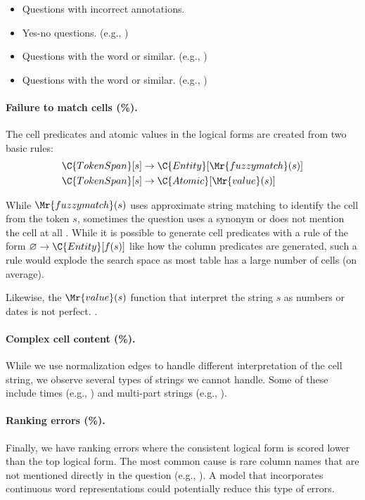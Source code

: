 \begin{itemize}
\item Questions with incorrect annotations.
\item Yes-no questions.
(e.g., )
\item Questions with the word  or similar.
(e.g., )
\item Questions with the word  or similar.
(e.g., )
\end{itemize}

\paragraph{Failure to match cells (\qqq\%).}
The cell predicates and atomic values in the logical forms
are created from two basic rules:
\begin{align*}
\C{TokenSpan}[s] & \to \C{Entity}[\Mr{fuzzymatch}(s)] \\
\C{TokenSpan}[s] & \to \C{Atomic}[\Mr{value}(s)] \\
\end{align*}

While $\Mr{fuzzymatch}(s)$ uses approximate string matching
to identify the cell from the token $s$,
sometimes the question uses a synonym
or does not mention the cell at all
.
While it is possible to generate cell predicates
with a rule of the form $\varnothing \to \C{Entity}[f(s)]$
like how the column predicates are generated,
such a rule would explode the search space
as most table has a large number of cells
(\qqq on average).

Likewise, the $\Mr{value}(s)$ function that interpret
the string $s$ as numbers or dates is not perfect.
.

\paragraph{Complex cell content (\qqq \%).}
While we use normalization edges to handle different
interpretation of the cell string,
we observe several types of strings we cannot handle.
Some of these include times (e.g., )
and multi-part strings (e.g., ).

\paragraph{Ranking errors (\qqq \%).}
Finally, we have ranking errors
where the consistent logical form is scored lower
than the top logical form.
The most common cause is rare column names
that are not mentioned directly in the question
(e.g., ).
A model that incorporates continuous word representations
could potentially reduce this type of errors.

